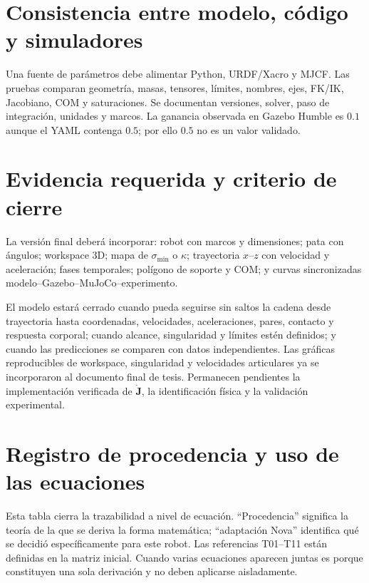 \documentclass[11pt,letterpaper]{article}
\newcommand{\mat}[1]{\bm{#1}}
\begin{document}
\section{Consistencia entre modelo, código y simuladores}
Una fuente de parámetros debe alimentar Python, URDF/Xacro y MJCF. Las pruebas
comparan geometría, masas, tensores, límites, nombres, ejes, FK/IK, Jacobiano,
COM y saturaciones. Se documentan versiones, solver, paso de integración,
unidades y marcos. La ganancia observada en Gazebo Humble es $0.1$ aunque el
YAML contenga $0.5$; por ello $0.5$ no es un valor validado.

\section{Evidencia requerida y criterio de cierre}
La versión final deberá incorporar: robot con marcos y dimensiones; pata con
ángulos; workspace 3D; mapa de $\sigma_{\min}$ o $\kappa$; trayectoria $x$--$z$
con velocidad y aceleración; fases temporales; polígono de soporte y COM; y
curvas sincronizadas modelo--Gazebo--MuJoCo--experimento.

El modelo estará cerrado cuando pueda seguirse sin saltos la cadena desde
trayectoria hasta coordenadas, velocidades, aceleraciones, pares, contacto y
respuesta corporal; cuando alcance, singularidad y límites estén definidos; y
cuando las predicciones se comparen con datos independientes. Las gráficas
reproducibles de workspace, singularidad y velocidades articulares ya se
incorporaron al documento final de tesis. Permanecen pendientes la
implementación verificada de $\dot{\mat J}$, la identificación física y la
validación experimental.

\section{Registro de procedencia y uso de las ecuaciones}
Esta tabla cierra la trazabilidad a nivel de ecuación. ``Procedencia'' significa
la teoría de la que se deriva la forma matemática; ``adaptación Nova'' identifica
qué se decidió específicamente para este robot. Las referencias T01--T11 están
definidas en la matriz inicial. Cuando varias ecuaciones aparecen juntas es
porque constituyen una sola derivación y no deben aplicarse aisladamente.
\end{document}
